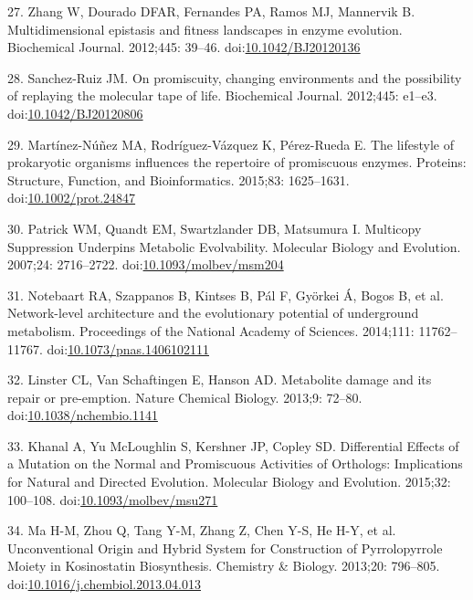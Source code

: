 \documentclass[12pt,twoside]{reedthesis}
\begin{document}
  \hypertarget{ref-zhangux5fmultidimensionalux5f2012}{}
  27. Zhang W, Dourado DFAR, Fernandes PA, Ramos MJ, Mannervik B.
  Multidimensional epistasis and fitness landscapes in enzyme evolution.
  Biochemical Journal. 2012;445: 39--46.
  doi:\href{https://doi.org/10.1042/BJ20120136}{10.1042/BJ20120136}
  
  \hypertarget{ref-sanchez-ruizux5fpromiscuityux5f2012}{}
  28. Sanchez-Ruiz JM. On promiscuity, changing environments and the
  possibility of replaying the molecular tape of life. Biochemical
  Journal. 2012;445: e1--e3.
  doi:\href{https://doi.org/10.1042/BJ20120806}{10.1042/BJ20120806}
  
  \hypertarget{ref-martinez-nunezux5flifestyleux5f2015}{}
  29. Martínez-Núñez MA, Rodríguez-Vázquez K, Pérez-Rueda E. The lifestyle
  of prokaryotic organisms influences the repertoire of promiscuous
  enzymes. Proteins: Structure, Function, and Bioinformatics. 2015;83:
  1625--1631.
  doi:\href{https://doi.org/10.1002/prot.24847}{10.1002/prot.24847}
  
  \hypertarget{ref-patrickux5fmulticopyux5f2007}{}
  30. Patrick WM, Quandt EM, Swartzlander DB, Matsumura I. Multicopy
  Suppression Underpins Metabolic Evolvability. Molecular Biology and
  Evolution. 2007;24: 2716--2722.
  doi:\href{https://doi.org/10.1093/molbev/msm204}{10.1093/molbev/msm204}
  
  \hypertarget{ref-notebaartux5fnetwork-levelux5f2014}{}
  31. Notebaart RA, Szappanos B, Kintses B, Pál F, Györkei Á, Bogos B, et
  al. Network-level architecture and the evolutionary potential of
  underground metabolism. Proceedings of the National Academy of Sciences.
  2014;111: 11762--11767.
  doi:\href{https://doi.org/10.1073/pnas.1406102111}{10.1073/pnas.1406102111}
  
  \hypertarget{ref-linsterux5fmetaboliteux5f2013}{}
  32. Linster CL, Van Schaftingen E, Hanson AD. Metabolite damage and its
  repair or pre-emption. Nature Chemical Biology. 2013;9: 72--80.
  doi:\href{https://doi.org/10.1038/nchembio.1141}{10.1038/nchembio.1141}
  
  \hypertarget{ref-khanalux5fdifferentialux5f2015}{}
  33. Khanal A, Yu McLoughlin S, Kershner JP, Copley SD. Differential
  Effects of a Mutation on the Normal and Promiscuous Activities of
  Orthologs: Implications for Natural and Directed Evolution. Molecular
  Biology and Evolution. 2015;32: 100--108.
  doi:\href{https://doi.org/10.1093/molbev/msu271}{10.1093/molbev/msu271}
  
  \hypertarget{ref-maux5funconventionalux5f2013}{}
  34. Ma H-M, Zhou Q, Tang Y-M, Zhang Z, Chen Y-S, He H-Y, et al.
  Unconventional Origin and Hybrid System for Construction of
  Pyrrolopyrrole Moiety in Kosinostatin Biosynthesis. Chemistry \&
  Biology. 2013;20: 796--805.
  doi:\href{https://doi.org/10.1016/j.chembiol.2013.04.013}{10.1016/j.chembiol.2013.04.013}
  
\end{document}
